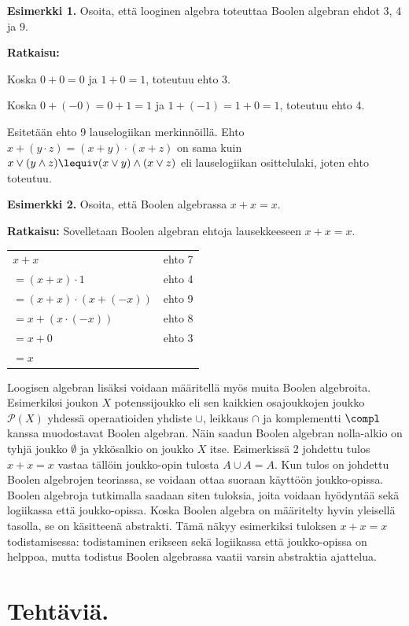 {\bf Esimerkki 1.}
Osoita, että looginen algebra toteuttaa Boolen algebran ehdot 3, 4 ja 9.

{\bf Ratkaisu:}

Koska $0 + 0 = 0$ ja $1 + 0 =1$, toteutuu ehto 3.

Koska $0 + (-0) = 0 + 1 = 1$ ja $1 + (-1) = 1 + 0 = 1$, toteutuu ehto 4.

Esitetään ehto 9 lauselogiikan merkinnöillä. Ehto $x+(y\cdot z)=(x+y)\cdot(x+z)$ on sama kuin $x\lor (y\land z) \lequiv (x\lor y)\land (x\lor z)$ eli lauselogiikan osittelulaki, joten ehto toteutuu.

{\bf Esimerkki 2.}
Osoita, että Boolen algebrassa $x + x = x$.


{\bf Ratkaisu:}
Sovelletaan Boolen algebran ehtoja lausekkeeseen $x + x = x$.

\begin{tabular}{ll}
$x + x$ & ehto 7 \\
$= (x + x) \cdot 1$ & ehto 4 \\
$= (x + x) \cdot (x + (-x))$ & ehto 9 \\
$= x + (x \cdot (-x))$ & ehto 8 \\
$= x + 0$ & ehto 3 \\
$= x$
\end{tabular}


Loogisen algebran lisäksi voidaan määritellä myös muita Boolen algebroita. Esimerkiksi joukon $X$ potenssijoukko eli sen kaikkien osajoukkojen joukko $\mathcal{P}(X)$ yhdessä operaatioiden yhdiste $\cup$, leikkaus $\cap$  ja komplementti $\compl$ kanssa muodostavat Boolen algebran. Näin saadun Boolen algebran nolla-alkio on tyhjä joukko $\emptyset$ ja ykkösalkio on joukko $X$ itse. Esimerkissä 2 johdettu tulos $x + x = x$ vastaa tällöin joukko-opin tulosta $A\cup A=A$. Kun tulos on johdettu Boolen algebrojen teoriassa, se voidaan ottaa suoraan käyttöön joukko-opissa. Boolen algebroja tutkimalla saadaan siten tuloksia, joita voidaan hyödyntää sekä logiikassa että joukko-opissa. Koska Boolen algebra on määritelty hyvin yleisellä tasolla, se on käsitteenä abstrakti. Tämä näkyy esimerkiksi tuloksen $x + x = x$ todistamisessa: todistaminen erikseen sekä logiikassa että joukko-opissa on helppoa, mutta todistus Boolen algebrassa vaatii varsin abstraktia ajattelua.


\newpage


\section*{Tehtäviä.}

